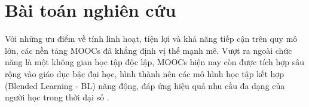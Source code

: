 


\section{Bài toán nghiên cứu}
Với những ưu điểm về tính linh hoạt, tiện lợi và khả năng tiếp cận trên quy mô lớn, các nền tảng MOOCs đã khẳng định vị thế mạnh mẽ. Vượt ra ngoài chức năng là một không gian học tập độc lập, MOOCs hiện nay còn được tích hợp sâu rộng vào giáo dục bậc đại học, hình thành nên các mô hình học tập kết hợp (Blended Learning - BL) năng động, đáp ứng hiệu quả nhu cầu đa dạng của người học trong thời đại số \cite{de2021use}.

